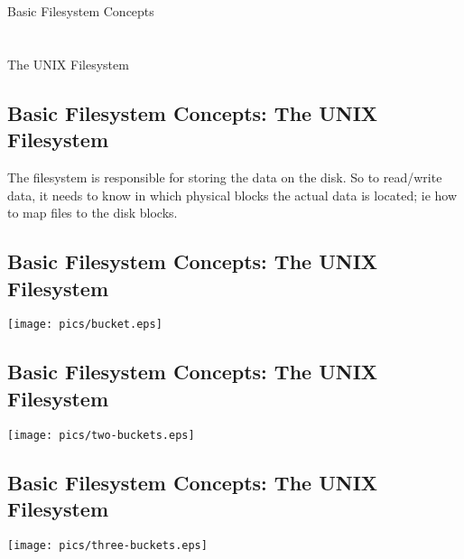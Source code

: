 \documentclass[xga]{xdvislides}
\begin{document}
\newpage
\vspace*{\fill}
\begin{center}
	\Hugesize
		Basic Filesystem Concepts\\ [1em]
	\hspace*{5mm}
	\blueline\\
	\hspace*{5mm}\\
		The UNIX Filesystem
\end{center}
\vspace*{\fill}

\subsection{Basic Filesystem Concepts: The UNIX Filesystem}
The filesystem is responsible for storing the data on the disk.
So to read/write data, it needs to know in which physical blocks the actual
data is located; ie how to map files to the disk blocks.


\subsection{Basic Filesystem Concepts: The UNIX Filesystem}
\vspace*{\fill}
\begin{center}
\texttt{[image: pics/bucket.eps]} \\
\end{center}
\vspace*{\fill}

\subsection{Basic Filesystem Concepts: The UNIX Filesystem}
\begin{center}
\texttt{[image: pics/two-buckets.eps]} \\
\end{center}

\subsection{Basic Filesystem Concepts: The UNIX Filesystem}
\vspace*{\fill}
\begin{center}
\texttt{[image: pics/three-buckets.eps]} \\
\end{center}
\vspace*{\fill}
\end{document}
